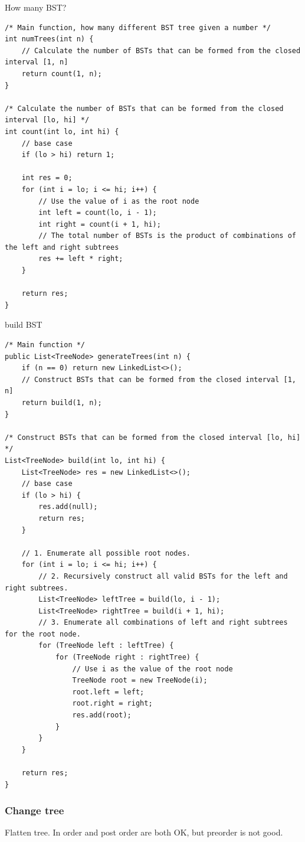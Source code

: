 \documentclass[a4paper,11pt,twoside]{book}
\begin{document}
	\par How many BST?
\begin{lstlisting}
/* Main function, how many different BST tree given a number */ 
int numTrees(int n) {
	// Calculate the number of BSTs that can be formed from the closed interval [1, n]
	return count(1, n);
}

/* Calculate the number of BSTs that can be formed from the closed interval [lo, hi] */
int count(int lo, int hi) {
	// base case
	if (lo > hi) return 1;
	
	int res = 0;
	for (int i = lo; i <= hi; i++) {
		// Use the value of i as the root node
		int left = count(lo, i - 1);
		int right = count(i + 1, hi);
		// The total number of BSTs is the product of combinations of the left and right subtrees
		res += left * right;
	}
	
	return res;
}	
\end{lstlisting}

\par build BST
\begin{lstlisting}
/* Main function */
public List<TreeNode> generateTrees(int n) {
	if (n == 0) return new LinkedList<>();
	// Construct BSTs that can be formed from the closed interval [1, n]
	return build(1, n);
}

/* Construct BSTs that can be formed from the closed interval [lo, hi] */
List<TreeNode> build(int lo, int hi) {
	List<TreeNode> res = new LinkedList<>();
	// base case
	if (lo > hi) {
		res.add(null);
		return res;
	}
	
	// 1. Enumerate all possible root nodes.
	for (int i = lo; i <= hi; i++) {
		// 2. Recursively construct all valid BSTs for the left and right subtrees.
		List<TreeNode> leftTree = build(lo, i - 1);
		List<TreeNode> rightTree = build(i + 1, hi);
		// 3. Enumerate all combinations of left and right subtrees for the root node.
		for (TreeNode left : leftTree) {
			for (TreeNode right : rightTree) {
				// Use i as the value of the root node
				TreeNode root = new TreeNode(i);
				root.left = left;
				root.right = right;
				res.add(root);
			}
		}
	}
	
	return res;
}
\end{lstlisting}

\subsubsection{Change tree}

	\par Flatten tree. In order and post order are both OK, but preorder is not good.
\end{document}
